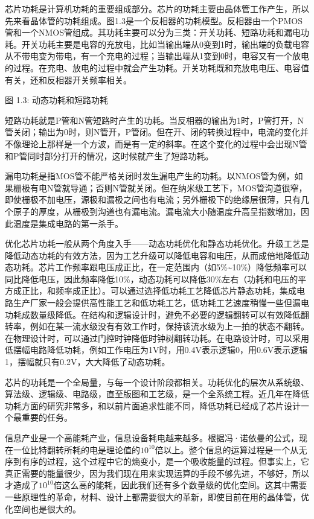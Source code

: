 \documentclass[]{ctexbook}
\begin{document}
芯片功耗是计算机功耗的重要组成部分。芯片的功耗主要由晶体管工作产生，所以先来看晶体管的功耗组成。图1.3是一个反相器的功耗模型。反相器由一个PMOS管和一个NMOS管组成。其功耗主要可以分为三类：开关功耗、短路功耗和漏电功耗。开关功耗主要是电容的充放电，比如当输出端从0变到1时，输出端的负载电容从不带电变为带电，有一个充电的过程；当输出端从1变到0时，电容又有一个放电的过程。在充电、放电的过程中就会产生功耗。开关功耗既和充放电电压、电容值有关，还和反相器开关频率相关。

图 1.3: 动态功耗和短路功耗

短路功耗就是P管和N管短路时产生的功耗。当反相器的输出为1时，P管打开，N管关闭；输出为0时，则N管开，P管闭。但在开、闭的转换过程中，电流的变化并不像理论上那样是一个方波，而是有一定的斜率。在这个变化的过程中会出现N管和P管同时部分打开的情况，这时候就产生了短路功耗。

漏电功耗是指MOS管不能严格关闭时发生漏电产生的功耗。以NMOS管为例，如果栅极有电N管就导通；否则N管就关闭。但在纳米级工艺下，MOS管沟道很窄，即使栅极不加电压，源极和漏极之间也有电流；另外栅极下的绝缘层很薄，只有几个原子的厚度，从栅极到沟道也有漏电流。漏电流大小随温度升高呈指数增加，因此温度是集成电路的第一杀手。

优化芯片功耗一般从两个角度入手------动态功耗优化和静态功耗优化。升级工艺是降低动态功耗的有效方法，因为工艺升级可以降低电容和电压，从而成倍地降低动态功耗。芯片工作频率跟电压成正比，在一定范围内（如5\%\textasciitilde10\%）降低频率可以同比降低电压，因此频率降低10\%，动态功耗可以降低30\%左右（功耗和电压的平方成正比，和频率成正比）。可以通过选择低功耗工艺降低芯片静态功耗，集成电路生产厂家一般会提供高性能工艺和低功耗工艺，低功耗工艺速度稍慢一些但漏电功耗成数量级降低。在结构和逻辑设计时，避免不必要的逻辑翻转可以有效降低翻转率，例如在某一流水级没有有效工作时，保持该流水级为上一拍的状态不翻转。在物理设计时，可以通过门控时钟降低时钟树翻转功耗。在电路设计时，可以采用低摆幅电路降低功耗，例如工作电压为1V时，用0.4V表示逻辑0，用0.6V表示逻辑1，摆幅就只有0.2V，大大降低了动态功耗。

芯片的功耗是一个全局量，与每一个设计阶段都相关。功耗优化的层次从系统级、算法级、逻辑级、电路级，直至版图和工艺级，是一个全系统工程。近几年在降低功耗方面的研究非常多，和以前片面追求性能不同，降低功耗已经成了芯片设计一个最重要的任务。

信息产业是一个高能耗产业，信息设备耗电越来越多。根据冯·诺依曼的公式，现在一位比特翻转所耗的电是理论值的\(10^{10}\)倍以上。整个信息的运算过程是一个从无序到有序的过程，这个过程中它的熵变小，是一个吸收能量的过程。但事实上，它真正需要的能量很少，因为我们现在用来实现运算的手段不够先进，不够好，所以才造成了\(10^{10}\)倍这么高的能耗，因此我们还有多个数量级的优化空间。这其中需要一些原理性的革命，材料、设计上都需要很大的革新，即使目前在用的晶体管，优化空间也是很大的。
\end{document}

